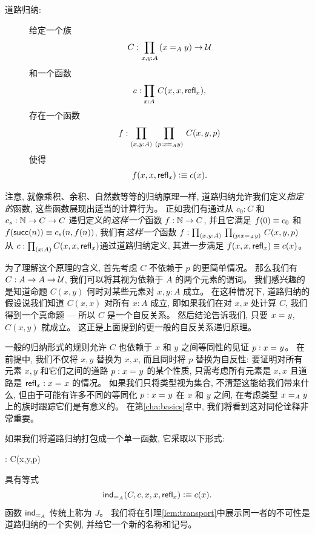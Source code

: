 \begin{description}
\item[道路归纳:]
给定一个族
\[ C : \prd{x,y:A} (\id[A]{x}{y}) \to \UU \]
和一个函数
\[ c :  \prd{x:A} C(x,x,\refl{x}),\]
存在一个函数
\[ f : \prd{x,y:A}{p:\id[A]{x}{y}} C(x,y,p) \]
使得
\[ f(x,x,\refl{x}) \defeq c(x). \]
\end{description}

注意, 就像乘积、余积、自然数等等的归纳原理一样, 道路归纳允许我们定义\emph{指定的}函数, 这些函数展现出适当的计算行为。
正如我们有通过从 $c_0:C$ 和 $c_s:\nat \to C \to C$ 递归定义的\emph{这样一个}函数 $f:\nat\to C$, 
并且它满足 $f(0)\jdeq c_0$ 和 $f(\suc(n))\jdeq c_s(n,f(n))$, 我们有\emph{这样一个}函数 $f : \dprd{x,y:A}{p:\id[A]{x}{y}} C(x,y,p)$ 
从 $c :  \prd{x:A} C(x,x,\refl{x})$通过道路归纳定义, 其进一步满足 $f(x,x,\refl{x}) \jdeq c(x)$。

为了理解这个原理的含义, 首先考虑 $C$ 不依赖于 $p$ 的更简单情况。
那么我们有 $C:A\to A\to \UU$, 我们可以将其视为依赖于 $A$ 的两个元素的谓词。
我们感兴趣的是知道命题 $C(x,y)$ 何时对某些元素对 $x,y:A$ 成立。
在这种情况下, 道路归纳的假设说我们知道 $C(x,x)$ 对所有 $x:A$ 成立, 即如果我们在对 $x, x$ 处计算 $C$, 我们得到一个真命题 --- 所以 $C$ 是一个自反关系。
然后结论告诉我们, 只要 $\id{x}{y}$, $C(x,y)$ 就成立。
这正是上面提到的更一般的自反关系递归原理。

一般的归纳形式的规则允许 $C$ 也依赖于 $x$ 和 $y$ 之间等同性的见证 $p:\id{x}{y}$。
在前提中, 我们不仅将 $x, y$ 替换为 $x,x$, 而且同时将 $p$ 替换为自反性: 要证明对所有元素 $x,y$ 和它们之间的道路 $p : \id{x}{y}$ 的某个性质, 只需考虑所有元素是 $x,x$ 且道路是 $\refl{x}: \id{x}{x}$ 的情况。
如果我们只将类型视为集合, 不清楚这能给我们带来什么, 但由于可能有许多不同的等同化 $p : \id{x}{y}$ 在 $x$ 和 $y$ 之间, 在考虑类型 $\id[A]{x}{y}$ 上的族时跟踪它们是有意义的。
在第\ref{cha:basics}章中, 我们将看到这对同伦诠释非常重要。

如果我们将道路归纳打包成一个单一函数, 它采取以下形式:
%
\begin{narrowmultline*}
   :  
   \to 
  \narrowbreak
     C(x,y,p)
\end{narrowmultline*}
具有等式
\[ \indid{A}(C,c,x,x,\refl{x}) \defeq c(x). \]
函数 $ \indid{A}$ 传统上称为 $J$。
%
我们将在引理\ref{lem:transport}中展示同一者的不可性是道路归纳的一个实例, 并给它一个新的名称和记号。

